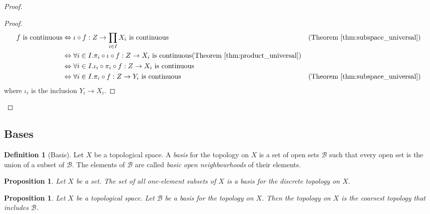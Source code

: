 \documentclass{book}
\let\qed\relax
\newtheorem{prop}[ax]{Proposition}
\theoremstyle{definition}
\newtheorem{df}[ax]{Definition}
\begin{document}
\begin{proof}
\pf
{}
\begin{proof}
	\pf
	\begin{align*}
		f \text{ is continuous}
		& \Leftrightarrow \iota \circ f : Z \rightarrow \prod_{i \in I} X_i \text{ is continuous} & (\text{Theorem \ref{thm:subspace_universal}}) \\
		& \Leftrightarrow \forall i \in I. \pi_i \circ \iota \circ f : Z \rightarrow X_i \text{ is continuous}  (\text{Theorem \ref{thm:product_universal}}) \\
		& \Leftrightarrow \forall i \in I. \iota_i \circ \pi_i \circ f : Z \rightarrow X_i \text{ is continuous} \\
		& \Leftrightarrow \forall i \in I. \pi_i \circ f : Z \rightarrow Y_i \text{ is continuous}
		& (\text{Theorem \ref{thm:subspace_universal}})
	\end{align*}
	where $\iota_i$ is the inclusion $Y_i \rightarrow X_i$.
\end{proof}
\qed
\end{proof}

\subsection{Bases}

\begin{df}[Basis]
Let $X$ be a topological space. A \emph{basis} for the topology on $X$ is a set of open sets $\mathcal{B}$ such that every open set is the union of a subset of $\mathcal{B}$. The elements of $\mathcal{B}$ are called \emph{basic open neighbourhoods} of their elements.
\end{df}

\begin{prop}
Let $X$ be a set. The set of all one-element subsets of $X$ is a basis for the discrete topology on $X$.
\end{prop}

\begin{prop}
Let $X$ be a topological space.
Let $\mathcal{B}$ be a basis for the topology on $X$.
Then the topology on $X$ is the coarsest topology that includes $\mathcal{B}$.
\end{prop}
\end{document}
